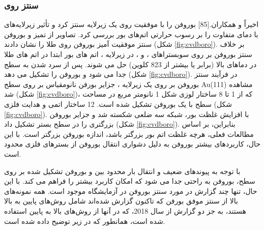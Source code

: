 \subsubsection{سنتز روی }
اخیراً  و همکاران.\cite{kiralyBoropheneSynthesisAu2019}[85] بوروفن را با موفقیت روی یک زیرلایه  سنتز کرد و تأثیر زیرلایه‌های  با دمای متفاوت را بر رسوب حرارتی اتم‌های بور بررسی کرد. تصاویر  از تمیز  و بوروفن سنتز موفقیت آمیز بوروفن روی طلا را نشان دادند (شکل \ref{fig:cvdboro}). بر خلاف سنتز بوروفن بر روی سوبستراهای ،  و ، در زیرلایه ، اتم های بور ابتدا در اتم های طلا در دماهای بالا (برابر یا بیشتر از 823 کلوین) حل می شوند. پس از سرد شدن به سطح جدا می شود و بوروفن را تشکیل می دهد (شکل \ref{fig:cvdboro}). در فرآیند سنتز بوروفن بر روی یک زیرلایه ، جزایر بورفن نانومقیاس بر روی سطح Au(111) مشاهده شد (شکل \ref{fig:cvdboro})، که از 1 تا 8 ساختار لوزی شکل 1 نانومتر مربع در مساحت سطح با یک بوروفن تشکیل شده است. 12 ساختار اتمی و هدایت فلزی (شکل \ref{fig:cvdboro}). با افزایش غلظت بور، شبکه سه ضلعی شکسته شد و جزایر بوروفن بزرگتری را در سطح بستر تشکیل داد (شکل \ref{fig:cvdboro}). بنابراین، بر اساس مطالعات فعلی، هرچه غلظت اتم بور بزرگتر باشد، اندازه بوروفن بزرگتر است. با این حال، کاربردهای بیشتر بوروفن به دلیل دشواری انتقال بوروفن از بسترهای فلزی محدود است.

با توجه به پیوندهای ضعیف و انتقال بار محدود بین  و بوروفن تشکیل شده بر روی سطح، بوروفن به راحتی جدا می شود که امکان کاربرد بیشتر را فراهم می کند. با این حال، تنها چند گزارش در مورد سنتز بوروفن در آزمایشگاه موجود است. همه نمونه‌های بالا از سنتز موفق بورفن که تاکنون گزارش شده‌اند شامل روش‌های پایین به بالا هستند، به جز دو گزارش از سال 2018، که در آنها از روش‌های بالا به پایین استفاده شده است، همانطور که در زیر توضیح داده شده است.
